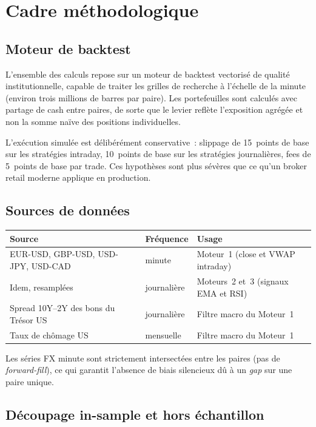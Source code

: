 \section{Cadre méthodologique}
\label{sec:methodology}

\subsection{Moteur de backtest}

L'ensemble des calculs repose sur un moteur de backtest vectorisé de qualité institutionnelle, capable de traiter les grilles de recherche à l'échelle de la minute (environ trois millions de barres par paire). Les portefeuilles sont calculés avec partage de cash entre paires, de sorte que le levier reflète l'exposition agrégée et non la somme naïve des positions individuelles.

L'exécution simulée est délibérément conservative~: slippage de 15~points de base sur les stratégies intraday, 10~points de base sur les stratégies journalières, fees de 5~points de base par trade. Ces hypothèses sont plus sévères que ce qu'un broker retail moderne applique en production.

\subsection{Sources de données}

\begin{center}
\renewcommand{\arraystretch}{1.2}
\begin{tabular}{lll}
\toprule
\textbf{Source} & \textbf{Fréquence} & \textbf{Usage} \\
\midrule
EUR-USD, GBP-USD, USD-JPY, USD-CAD & minute & Moteur~1 (close et VWAP intraday) \\
Idem, resamplées & journalière & Moteurs~2 et~3 (signaux EMA et RSI) \\
Spread 10Y--2Y des bons du Trésor US & journalière & Filtre macro du Moteur~1 \\
Taux de chômage US & mensuelle & Filtre macro du Moteur~1 \\
\bottomrule
\end{tabular}
\end{center}

Les séries FX minute sont strictement intersectées entre les paires (pas de \emph{forward-fill}), ce qui garantit l'absence de biais silencieux dû à un \emph{gap} sur une paire unique.

\subsection{Découpage in-sample et hors échantillon}

